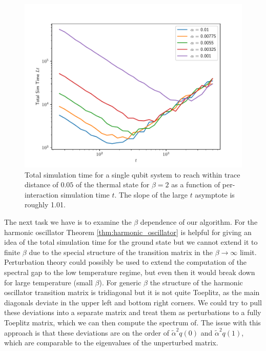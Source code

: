 \documentclass{article}
\begin{document}
\begin{figure} 
    \centering
    \includegraphics[width=0.75\linewidth]{numerics/data/single_qubit_tot_time_vs_t.pdf}
    \caption{Total simulation time for a single qubit system to reach within trace distance of $0.05$ of the thermal state for $\beta = 2$ as a function of per-interaction simulation time $t$. The slope of the large $t$ asymptote is roughly 1.01.}\label{fig:tot_time_vs_single_time}
\end{figure}

The next task we have is to examine the $\beta$ dependence of our algorithm. For the harmonic oscillator Theorem \ref{thm:harmonic_oscillator} is helpful for giving an idea of the total simulation time for the ground state but we cannot extend it to finite $\beta$ due to the special structure of the transition matrix in the $\beta \to \infty$ limit. Perturbation theory could possibly be used to extend the computation of the spectral gap to the low temperature regime, but even then it would break down for large temperature (small $\beta$). For generic $\beta$ the structure of the harmonic oscillator transition matrix is tridiagonal but it is not quite Toeplitz, as the main diagonals deviate in the upper left and bottom right corners. We could try to pull these deviations into a separate matrix and treat them as perturbations to a fully Toeplitz matrix, which we can then compute the spectrum of. The issue with this approach is that these deviations are on the order of $\widetilde{\alpha}^2 q(0)$ and $\widetilde{\alpha}^2 q(1)$, which are comparable to the eigenvalues of the unperturbed matrix.
\end{document}
